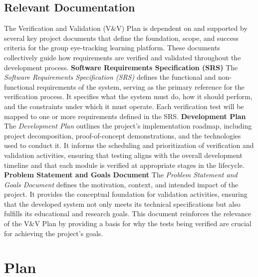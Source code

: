 \documentclass[12pt, titlepage]{article}
\begin{document}
\subsection{Relevant Documentation}

The Verification and Validation (V\&V) Plan is dependent on and supported by several key project documents that define the foundation, scope, and success criteria for the group eye-tracking learning platform. These documents collectively guide how requirements are verified and validated throughout the development process.
\newline
\newline
\textbf{Software Requirements Specification (SRS)}
\newline
The \textit{Software Requirements Specification (SRS)} defines the functional and non-functional requirements of the system, serving as the primary reference for the verification process. It specifies what the system must do, how it should perform, and the constraints under which it must operate. Each verification test will be mapped to one or more requirements defined in the SRS.
\newline
\newline
\textbf{Development Plan}
\newline
The \textit{Development Plan} outlines the project’s implementation roadmap, including project decomposition, proof-of-concept demonstrations, and the technologies used to conduct it. It informs the scheduling and prioritization of verification and validation activities, ensuring that testing aligns with the overall development timeline and that each module is verified at appropriate stages in the lifecycle.
\newline
\newline
\textbf{Problem Statement and Goals Document}
\newline
The \textit{Problem Statement and Goals Document} defines the motivation, context, and intended impact of the project. It provides the conceptual foundation for validation activities, ensuring that the developed system not only meets its technical specifications but also fulfills its educational and research goals. This document reinforces the relevance of the V\&V Plan by providing a basis for why the tests being verified are crucial for achieving the project’s goals.
\newline
\newline

\section{Plan}
\end{document}
